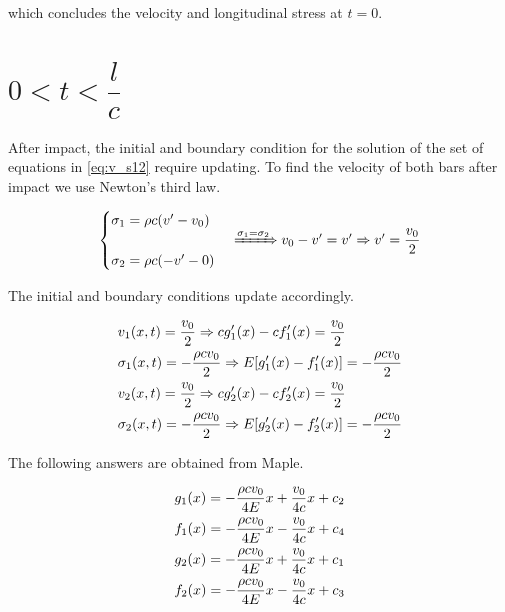 \documentclass{article}
\begin{document}
which concludes the velocity and longitudinal stress at $t = 0$.

\section{$ 0 < t < \dfrac{l}{c}$}
After impact, the initial and boundary condition for the solution of the set of equations in \cref{eq:v_s12} require updating. To find the velocity of both bars after impact we use Newton's third law.

\begin{equation*}
\begin{matrix}
    \begin{cases}
        \sigma_1 = \rho c (v' - v_0) \\
        \\
        \sigma_2 = \rho c (-v' - 0) \\
    \end{cases}
    \xRightarrow[]{\sigma_1 = \sigma_2}
    v_0 - v' = v' \Rightarrow v' = \dfrac{v_0}{2}
\end{matrix}
\end{equation*}

The initial and boundary conditions update accordingly.

\begin{align}
    & v_1(x, t) = \frac{v_0}{2} \Rightarrow c g_1'(x) - c f_1'(x) = \frac{v_0}{2} \notag\\
    & \sigma_1(x, t) = -\frac{\rho c v_0}{2} \Rightarrow E [g_1'(x) - f_1'(x)] = -\frac{\rho c v_0}{2} \notag\\
    & v_2(x, t) = \frac{v_0}{2} \Rightarrow c g_2'(x) - c f_2'(x) = \frac{v_0}{2} \notag\\
    & \sigma_2(x, t) = -\frac{\rho c v_0}{2} \Rightarrow E [g_2'(x) - f_2'(x)] = -\frac{\rho c v_0}{2}
    \label{eq:tl/c}
\end{align}

The following answers are obtained from Maple.

\begin{align}
    & g_1(x) = -\frac{\rho c v_0}{4E}x + \frac{v_0}{4c}x + c_2 \notag\\
    & f_1(x) = -\frac{\rho c v_0}{4E}x - \frac{v_0}{4c}x + c_4 \notag\\
    & g_2(x) = -\frac{\rho c v_0}{4E}x + \frac{v_0}{4c}x + c_1 \notag\\
    & f_2(x) = -\frac{\rho c v_0}{4E}x - \frac{v_0}{4c}x + c_3
    \label{eq:tl/c_ans}
\end{align}
\end{document}
